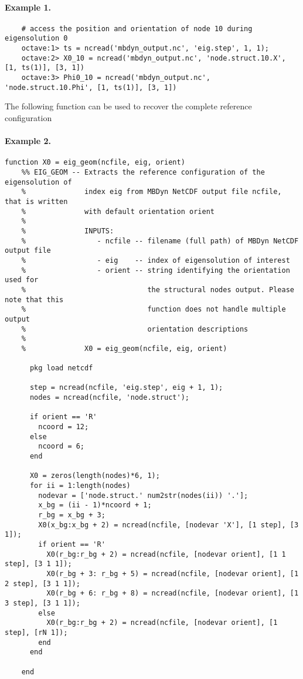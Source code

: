 \paragraph{Example 1.}
\begin{verbatim}
    # access the position and orientation of node 10 during eigensolution 0
    octave:1> ts = ncread('mbdyn_output.nc', 'eig.step', 1, 1);
    octave:2> X0_10 = ncread('mbdyn_output.nc', 'node.struct.10.X', [1, ts(1)], [3, 1]) 
    octave:3> Phi0_10 = ncread('mbdyn_output.nc', 'node.struct.10.Phi', [1, ts(1)], [3, 1])
\end{verbatim}
The following function can be used to recover the complete reference configuration
\paragraph{Example 2.}
\begin{verbatim}
function X0 = eig_geom(ncfile, eig, orient)
    %% EIG_GEOM -- Extracts the reference configuration of the eigensolution of 
    %              index eig from MBDyn NetCDF output file ncfile, that is written
    %              with default orientation orient 
    %
    %              INPUTS:
    %                 - ncfile -- filename (full path) of MBDyn NetCDF output file
    %                 - eig    -- index of eigensolution of interest
    %                 - orient -- string identifying the orientation used for 
    %                             the structural nodes output. Please note that this
    %                             function does not handle multiple output
    %                             orientation descriptions
    %              
    %              X0 = eig_geom(ncfile, eig, orient)
    
      pkg load netcdf
    
      step = ncread(ncfile, 'eig.step', eig + 1, 1);
      nodes = ncread(ncfile, 'node.struct');
      
      if orient == 'R'
        ncoord = 12;
      else
        ncoord = 6;
      end
      
      X0 = zeros(length(nodes)*6, 1);
      for ii = 1:length(nodes)
        nodevar = ['node.struct.' num2str(nodes(ii)) '.'];
        x_bg = (ii - 1)*ncoord + 1;
        r_bg = x_bg + 3;
        X0(x_bg:x_bg + 2) = ncread(ncfile, [nodevar 'X'], [1 step], [3 1]);
        if orient == 'R'
          X0(r_bg:r_bg + 2) = ncread(ncfile, [nodevar orient], [1 1 step], [3 1 1]);
          X0(r_bg + 3: r_bg + 5) = ncread(ncfile, [nodevar orient], [1 2 step], [3 1 1]);
          X0(r_bg + 6: r_bg + 8) = ncread(ncfile, [nodevar orient], [1 3 step], [3 1 1]);
        else
          X0(r_bg:r_bg + 2) = ncread(ncfile, [nodevar orient], [1 step], [rN 1]);
        end
      end
      
    end
\end{verbatim}
